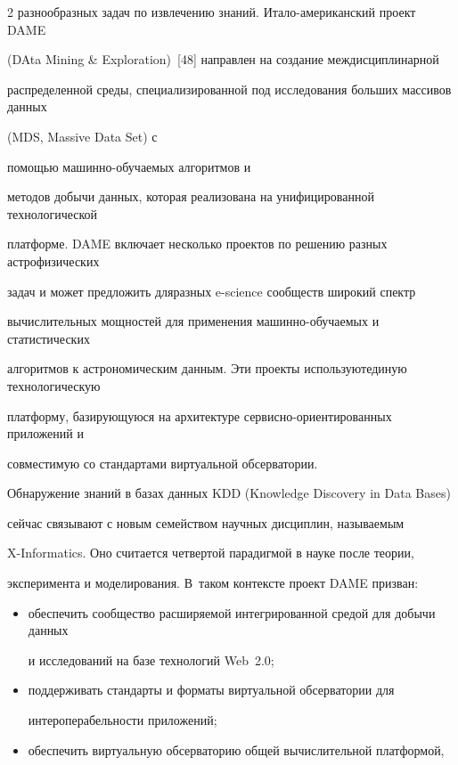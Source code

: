 \begin{multicols}{2}
разнообразных задач по извлечению знаний. Ита\-ло-аме\-ри\-кан\-ский проект DAME 

({DAta Mining} \& {Exploration})~[48] на\-правлен на создание междисциплинарной 

распределенной среды, специализированной под исследования больших массивов данных 

(MDS, {Massive Data Set}) с\linebreak

 помощью ма\-шин\-но-обуча\-емых алгоритмов и 

методов добычи данных, которая реализована на унифицированной технологической 

платформе. DAME включает несколько проектов по решению разных астрофизических 

задач и может предложить для\linebreak разных e-science сообществ широкий спектр 

вы\-чис\-ли\-тель\-ных мощ\-ностей для применения ма\-шин\-но-обуча\-емых и статистических 

алгоритмов к астрономическим данным. Эти проекты используют\linebreak единую технологическую 

платформу, ба\-зи\-ру\-ющу\-юся на архитектуре сер\-вис\-но-ориен\-ти\-ро\-ван\-ных приложений и 

совместимую со стандартами виртуальной обсерватории. 

  

  Обнаружение знаний в базах данных KDD ({Knowledge Discovery in Data Bases}) 

сейчас связывают с новым семейством научных дисциплин, называемым 

  X-Informatics. Оно считается четвертой парадигмой в науке после теории, 

эксперимента и моделирования. В~таком контексте проект DAME призван: 

  \begin{itemize}

\item обеспечить сообщество расширяемой интегрированной средой для добычи данных 

и исследований на базе технологий Web~2.0;

\item поддерживать стандарты и форматы виртуальной обсерватории для 

интероперабельности приложений;

\item обеспечить виртуальную обсерваторию общей вычислительной платформой, 


\end{itemize}
\end{multicols}
